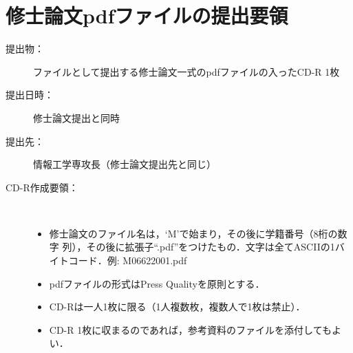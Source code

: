 \documentclass[main]{subfiles}
\begin{document}
\appendix
\chapter{修士論文pdfファイルの提出要領}
\begin{description}
\item[提出物：] ファイルとして提出する修士論文一式のpdfファイルの入ったCD-R 1枚
\item[提出日時：] 修士論文提出と同時
\item[提出先：] 情報工学専攻長（修士論文提出先と同じ）
\item[CD-R作成要領：] 　
\begin{itemize}
\item 修士論文のファイル名は，`M'で始まり，その後に学籍番号（8桁の数字
      列），その後に拡張子``.pdf''をつけたもの．文字は全てASCIIの1バイトコード．例: M06622001.pdf
\item pdfファイルの形式はPress Qualityを原則とする．
\item CD-Rは一人1枚に限る（1人複数枚，複数人で1枚は禁止）．
\item CD-R 1枚に収まるのであれば，参考資料のファイルを添付してもよい．
\end{itemize}
\end{description}
\end{document}
